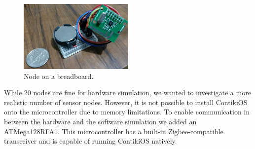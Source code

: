\begin{figure}[h!]
  \centering
  \includegraphics[width=0.5\textwidth]{images/phone_picture.png}
  \caption{Node on a breadboard.
  \label{img:flowchart}
  }
\end{figure}

While 20 nodes are fine for hardware simulation, we wanted to investigate a more realistic number of sensor nodes. However, it is not possible to install ContikiOS onto the microcontroller due to memory limitations. To enable communication in between the hardware and the software simulation we added an ATMega128RFA1. This microcontroller has a built-in Zigbee-compatible transceiver and is capable of running ContikiOS natively.
